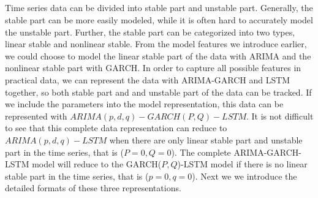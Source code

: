 \subsection{}
\vspace{-0.10in}

Time series data can be divided into  stable part and  unstable part.  Generally, the stable part can be more easily modeled, while it is often hard to  accurately model the unstable part. Further, the stable part can be categorized  into two types, linear stable  and nonlinear stable. From the model features we introduce earlier, we could choose to model the linear stable part of the data with ARIMA and the nonlinear stable part with GARCH. In order to capture all possible features in practical data, we can represent the data with  ARIMA-GARCH and LSTM together, so both stable part and and unstable part of the data can be tracked. If we include the parameters into the model representation, this data can be represented with $ARIMA(p,d,q)-GARCH(P,Q)-LSTM$.  It is not difficult to see that this complete data representation can reduce to $ARIMA(p,d,q)-LSTM$ when there are only linear stable part and unstable part in the time series, that is ($P=0,Q=0$). The complete ARIMA-GARCH-LSTM model  will reduce to the GARCH($P,Q$)-LSTM model if there is no linear stable part in the time series, that is ($p=0,q=0$). Next we we introduce the detailed formats of these three representations. 


